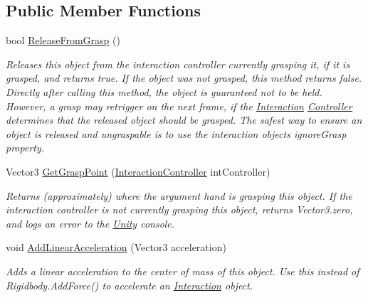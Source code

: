 \subsection*{Public Member Functions}
\begin{DoxyCompactItemize}
\item 
bool \mbox{\hyperlink{class_leap_1_1_unity_1_1_interaction_1_1_interaction_behaviour_a0745a6c1eff42ae2e13a3e624fffab93}{Release\+From\+Grasp}} ()
\begin{DoxyCompactList}\small\item\em Releases this object from the interaction controller currently grasping it, if it is grasped, and returns true. If the object was not grasped, this method returns false. Directly after calling this method, the object is guaranteed not to be held. However, a grasp may retrigger on the next frame, if the \mbox{\hyperlink{namespace_leap_1_1_unity_1_1_interaction}{Interaction}} \mbox{\hyperlink{class_leap_1_1_controller}{Controller}} determines that the released object should be grasped. The safest way to ensure an object is released and ungraspable is to use the interaction object\textquotesingle{}s ignore\+Grasp property. \end{DoxyCompactList}\item 
Vector3 \mbox{\hyperlink{class_leap_1_1_unity_1_1_interaction_1_1_interaction_behaviour_ac379f3f2782ecefa91d14e2f0007521a}{Get\+Grasp\+Point}} (\mbox{\hyperlink{class_leap_1_1_unity_1_1_interaction_1_1_interaction_controller}{Interaction\+Controller}} int\+Controller)
\begin{DoxyCompactList}\small\item\em Returns (approximately) where the argument hand is grasping this object. If the interaction controller is not currently grasping this object, returns Vector3.\+zero, and logs an error to the \mbox{\hyperlink{namespace_leap_1_1_unity}{Unity}} console. \end{DoxyCompactList}\item 
void \mbox{\hyperlink{class_leap_1_1_unity_1_1_interaction_1_1_interaction_behaviour_ad7c8cdc8d52f0de4d0036a76855b8926}{Add\+Linear\+Acceleration}} (Vector3 acceleration)
\begin{DoxyCompactList}\small\item\em Adds a linear acceleration to the center of mass of this object. Use this instead of Rigidbody.\+Add\+Force() to accelerate an \mbox{\hyperlink{namespace_leap_1_1_unity_1_1_interaction}{Interaction}} object. \end{DoxyCompactList}\item 

\end{DoxyCompactItemize}
